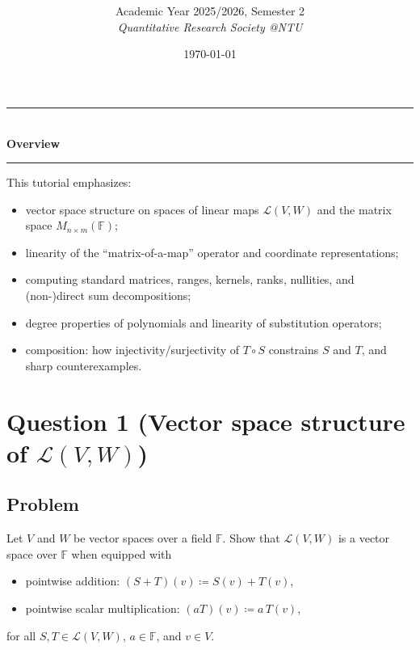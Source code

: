 \documentclass[12pt]{article}
\title{
\CourseCode\ \CourseName \\[0.3em]
\large \DocType
}
\author{
  Academic Year 2025/2026, Semester 2 \\[0.25em]
  \textit{Quantitative Research Society @NTU}
}
\date{\today}
\newcommand{\F}{\mathbb{F}}
\newcommand{\cL}{\mathcal{L}}
\begin{document}
\maketitle
\thispagestyle{plainfirst}
\pagestyle{main}

\begin{center}
  \rule{0.8\textwidth}{0.4pt}\\[4pt]
  \textbf{Overview}\\[2pt]
  \rule{0.8\textwidth}{0.4pt}
\end{center}

\noindent
This tutorial emphasizes:
\begin{itemize}[leftmargin=*]
  \item vector space structure on spaces of linear maps $\cL(V,W)$ and the matrix space $M_{n\times m}(\F)$;
  \item linearity of the ``matrix-of-a-map'' operator and coordinate representations;
  \item computing standard matrices, ranges, kernels, ranks, nullities, and (non-)direct sum decompositions;
  \item degree properties of polynomials and linearity of substitution operators;
  \item composition: how injectivity/surjectivity of $T\circ S$ constrains $S$ and $T$, and sharp counterexamples.
\end{itemize}

\newpage
\tableofcontents
\newpage

\section{Question 1 (Vector space structure of $\cL(V,W)$)}
\subsection{Problem}
Let $V$ and $W$ be vector spaces over a field $\F$.
Show that $\cL(V,W)$ is a vector space over $\F$ when equipped with
\begin{itemize}[leftmargin=*]
\item pointwise addition: $(S+T)(v)\coloneqq S(v)+T(v)$,
\item pointwise scalar multiplication: $(aT)(v)\coloneqq a\,T(v)$,
\end{itemize}
for all $S,T\in\cL(V,W)$, $a\in\F$, and $v\in V$.
\end{document}
